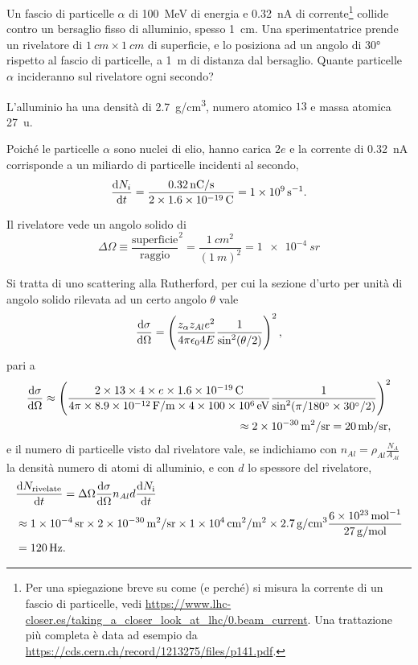 \begin{Exercise}[title={Scattering Rutherford}]
Un fascio di particelle $\alpha$ di \SI{100}{MeV} di energia e \SI{0.32}{nA} di corrente\footnote{Per una spiegazione breve su come (e perché) si misura la corrente di un fascio di particelle, vedi \url{https://www.lhc-closer.es/taking_a_closer_look_at_lhc/0.beam_current}. Una trattazione più completa è data ad esempio da \url{https://cds.cern.ch/record/1213275/files/p141.pdf}.} collide contro un bersaglio fisso di alluminio, spesso \SI{1}{cm}. Una sperimentatrice prende un rivelatore di $\SI{1}{cm}\times\SI{1}{cm}$ di superficie, e lo posiziona ad un angolo di \ang{30} rispetto al fascio di particelle, a \SI{1}{m} di distanza dal bersaglio. Quante particelle $\alpha$ incideranno sul rivelatore ogni secondo?
\end{Exercise}
\begin{Answer}
L'alluminio ha una densità di \SI{2.7}{g/cm^3}, numero atomico $13$ e massa atomica \SI{27}{u}.

Poiché le particelle $\alpha$ sono nuclei di elio, hanno carica $2e$ e la corrente di \SI{0.32}{nA} corrisponde a un miliardo di particelle incidenti al secondo,
\[
\dv{N_i}{t}=\frac{\SI{0.32}{nC/s}}{2\times\SI{1.6e-19}{C}} = \SI{1e9}{s^{-1}}.
\]

Il rivelatore vede un angolo solido di
\[
\Delta\Omega\equiv \frac{\text{superficie}}{\text{raggio}}^2 = \frac{\SI{1}{cm^2}}{(\SI{1}{m})^2} = \SI{1e-4}{sr}
\]

Si tratta di uno scattering alla Rutherford, per cui la sezione d'urto per unità di angolo solido rilevata ad un certo angolo $\theta$ vale
\[
\dv{\sigma}{\Omega} = \left(\frac{z_{\alpha}z_{Al}e^2}{4\pi\epsilon_04E}\frac{1}{\sin^2(\theta/2)}\right)^2,
\]
pari a
\begin{equation}\begin{split}
\dv{\sigma}{\Omega} \approx \left(\frac{2\times13\times4\times e\times\SI{1.6e-19}{C}}{4\pi\times\SI{8.9e-12}{F/m}\times4\times\SI{100e6}{eV}}\frac{1}{\sin^2(\pi/\ang{180}\times\ang{30}/2)}\right)^2\\
\approx \SI{2e-30}{m^2/sr}=\SI{20}{mb/sr},
\end{split}\end{equation}
e il numero di particelle visto dal rivelatore vale, se indichiamo con $n_{Al}=\rho_{Al}\frac{N_A}{A_{Al}}$ la densità numero di atomi di alluminio, e con $d$ lo spessore del rivelatore,
\begin{equation*}
\begin{split}
&\dv{N_\text{rivelate}}{t}=\Delta\Omega\dv{\sigma}{\Omega}n_{Al}d \dv{N_\text{i}}{t}\\ 
&\approx\SI{1e-4}{sr}\times \SI{2e-30}{m^2/sr} \times \SI{1e4}{cm^2/m^2}  \times \SI{2.7}{g/cm^3} \frac{\SI{6e23}{mol^{-1}}}{\SI{27}{g/mol}}\\&= \SI{120}{Hz}.
\end{split}
\end{equation*}
\end{Answer}

